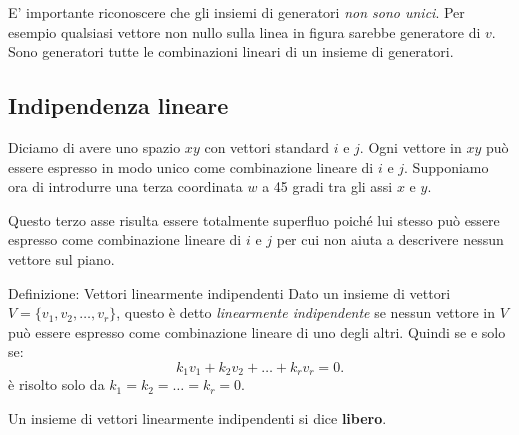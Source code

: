 \documentclass[x11names]{article}
\begin{document}
\noindent
E' importante riconoscere che gli insiemi di generatori \textit{non sono unici}. Per esempio qualsiasi vettore non nullo sulla linea in figura sarebbe generatore  di $v$. Sono generatori tutte le combinazioni lineari di un insieme di generatori.

\subsection{Indipendenza lineare}
Diciamo di avere uno spazio $xy$ con vettori standard $i$ e $j$. Ogni vettore in $xy$ può essere espresso in modo unico come combinazione lineare di $i$ e $j$. Supponiamo ora di introdurre una terza coordinata $w$ a 45 gradi tra gli assi $x$ e $y$. 

Questo terzo asse risulta essere totalmente superfluo poiché lui stesso può essere espresso come combinazione lineare di $i$ e $j$ per cui non aiuta a descrivere nessun vettore sul piano.


\begin{center}
\colorbox{myblue}{\begin{minipage}{5.75in}
\begin{blues}{Definizione: Vettori linearmente indipendenti}
Dato un insieme di vettori $V=\{v_1,v_2,\dots,v_{r}\}$, questo  è detto \textit{linearmente indipendente} se nessun vettore in $V$ può essere espresso come combinazione lineare di uno degli altri. Quindi se e solo se:
\[
k_1v_1 + k_2v_2 + \dots + k_rv_r = 0
.\] 
è risolto solo da $k_1 =k_2= \dots = k_r =0$.

Un insieme di vettori linearmente indipendenti si dice \textbf{libero}.
\end{blues}
\end{minipage}}        
\end{center}
\end{document}
